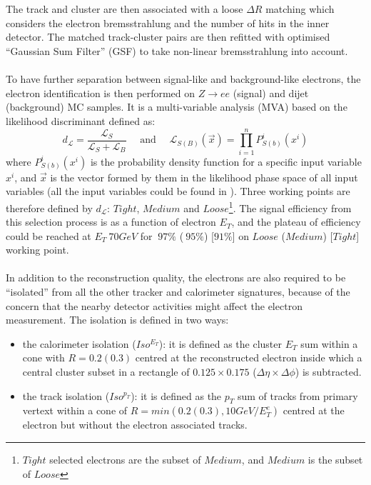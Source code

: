 \\
\\The track and cluster are then associated with a loose $\Delta R$ matching which considers the electron bremsstrahlung and the number of hits in the inner detector. The matched track-cluster pairs are then refitted with optimised ``Gaussian Sum Filter'' (GSF) \cite{ATLAS-CONF-2012-047} to take non-linear bremsstrahlung into account. 
\\
\\To have further separation between signal-like and background-like electrons, the electron identification is then performed on $Z \rightarrow ee$ (signal) and dijet (background) MC samples. It is a multi-variable analysis (MVA) based on the likelihood discriminant defined as:
\\
\begin{equation}
d_{\mathcal{L}}=\frac{\mathcal{L}_{S}}{\mathcal{L}_{S}+\mathcal{L}_{B}}    
\quad \text{ and } \quad
\mathcal{L}_{S(B)}(\vec{x})=\prod_{i = 1}^{n}P^{i}_{S(b)}(x^{i})
\end{equation}
where $P^{i}_{S(b)}(x^{i})$ is the probability density function for a specific input variable $x^{i}$, and $\vec{x}$ is the vector formed by them in the likelihood phase space of all input variables (all the input variables could be found in \cite{}). Three working points are therefore defined by $d_{\mathcal{L}}$: $Tight$, $Medium$ and $Loose$\footnote{$Tight$ selected electrons are the subset of $Medium$, and $Medium$ is the subset of $Loose$}. The signal efficiency from this selection process is as a function of electron $E_{T}$, and the plateau of efficiency could be reached at $E_{T}~70GeV$ for $~97\%$ ($~95\%$) [$91\%$] on $Loose$ ($Medium$) [$Tight$] working point. 
\\
\\In addition to the reconstruction quality, the electrons are also required to be ``isolated'' from all the other tracker and calorimeter signatures, because of the concern that the nearby detector activities might affect the electron measurement. The isolation is defined in two ways: 
\begin{itemize}
	\item the calorimeter isolation ($Iso^{E_{T}}$): it is defined as the cluster $E_{T}$ sum within a cone with $R=0.2(0.3)$ centred at the reconstructed electron inside which a central cluster subset in a rectangle of $0.125 \times 0.175$ ($\Delta \eta \times \Delta \phi$) is subtracted.
	\item the track isolation ($Iso^{p_{T}}$): it is defined as the $p_{T}$ sum of tracks from primary vertext within a cone of $R=min(0.2(0.3), 10GeV/E^{e}_{T})$ centred at the electron but without the electron associated tracks.  
\end{itemize}
